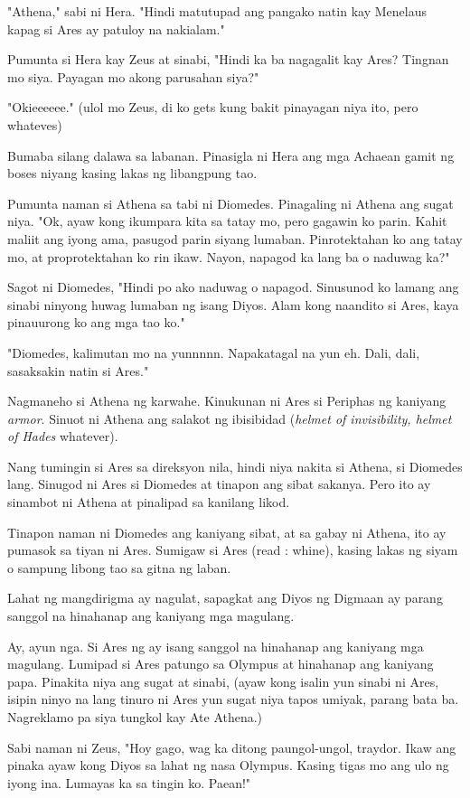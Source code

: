 \documentclass[12pt,letterpaper]{report}
\begin{document}
"Athena," sabi ni Hera. "Hindi matutupad ang pangako natin kay Menelaus kapag si Ares ay patuloy na nakialam."

Pumunta si Hera kay Zeus at sinabi, "Hindi ka ba nagagalit kay Ares? Tingnan mo siya. Payagan mo akong parusahan siya?"

"Okieeeeee." (ulol mo Zeus, di ko gets kung bakit pinayagan niya ito, pero whateves)

Bumaba silang dalawa sa labanan. Pinasigla ni Hera ang mga Achaean gamit ng boses niyang kasing lakas ng libangpung tao.

Pumunta naman si Athena sa tabi ni Diomedes. Pinagaling ni Athena ang sugat niya. "Ok, ayaw kong ikumpara kita sa tatay mo, pero gagawin ko parin. Kahit maliit ang iyong ama, pasugod parin siyang lumaban. Pinrotektahan ko ang tatay mo, at proprotektahan ko rin ikaw. Nayon, napagod ka lang ba o naduwag ka?"

Sagot ni Diomedes, "Hindi po ako naduwag o napagod. Sinusunod ko lamang ang sinabi ninyong huwag lumaban ng isang Diyos. Alam kong naandito si Ares, kaya pinauurong ko ang mga tao ko."

"Diomedes, kalimutan mo na yunnnnn. Napakatagal na yun eh. Dali, dali, sasaksakin natin si Ares."

Nagmaneho si Athena ng karwahe. Kinukunan ni Ares si Periphas ng kaniyang \textit{armor}. Sinuot ni Athena ang salakot ng ibisibidad (\textit{helmet of invisibility, helmet of Hades} whatever).

Nang tumingin si Ares sa direksyon nila, hindi niya nakita si Athena, si Diomedes lang. Sinugod ni Ares si Diomedes at tinapon ang sibat sakanya. Pero ito ay sinambot ni Athena at pinalipad sa kanilang likod.

Tinapon naman ni Diomedes ang kaniyang sibat, at sa gabay ni Athena, ito ay pumasok sa tiyan ni Ares. Sumigaw si Ares (read : whine), kasing lakas ng siyam o sampung libong tao sa gitna ng laban.

Lahat ng mangdirigma ay nagulat, sapagkat ang Diyos ng Digmaan ay parang sanggol na hinahanap ang kaniyang mga magulang.

Ay, ayun nga. Si Ares ng ay isang sanggol na hinahanap ang kaniyang mga magulang. Lumipad si Ares patungo sa Olympus at hinahanap ang kaniyang papa. Pinakita niya ang sugat at sinabi, (ayaw kong isalin yun sinabi ni Ares, isipin ninyo na lang tinuro ni Ares yun sugat niya tapos umiyak, parang bata ba. Nagreklamo pa siya tungkol kay Ate Athena.)

Sabi naman ni Zeus, "Hoy gago, wag ka ditong paungol-ungol, traydor. Ikaw ang pinaka ayaw kong Diyos sa lahat ng nasa Olympus. Kasing tigas mo ang ulo ng iyong ina. Lumayas ka sa tingin ko. Paean!"
\end{document}
